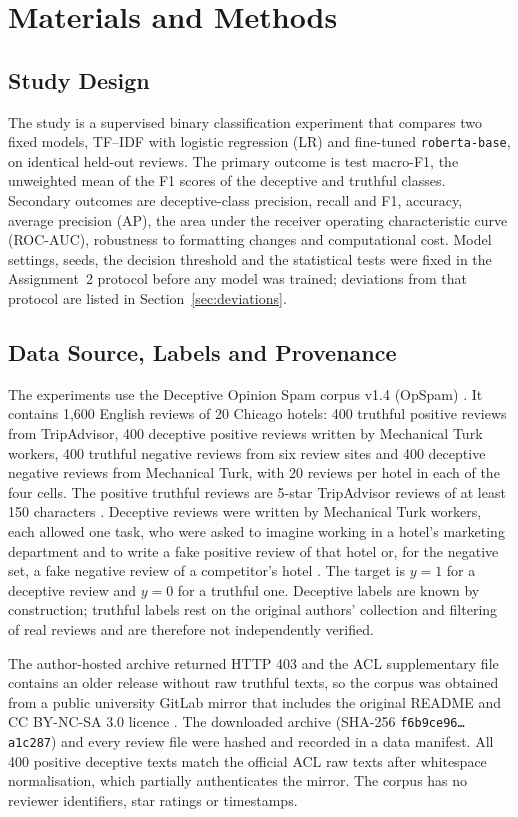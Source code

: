 \section{Materials and Methods}
\label{sec:methods}
\subsection{Study Design}
The study is a supervised binary classification experiment that compares two fixed models, TF--IDF with logistic regression (LR) and fine-tuned \texttt{roberta-base}, on identical held-out reviews. The primary outcome is test macro-F1, the unweighted mean of the F1 scores of the deceptive and truthful classes. Secondary outcomes are deceptive-class precision, recall and F1, accuracy, average precision (AP), the area under the receiver operating characteristic curve (ROC-AUC), robustness to formatting changes and computational cost. Model settings, seeds, the decision threshold and the statistical tests were fixed in the Assignment~2 protocol before any model was trained; deviations from that protocol are listed in Section~\ref{sec:deviations}.

\subsection{Data Source, Labels and Provenance}
The experiments use the Deceptive Opinion Spam corpus v1.4 (OpSpam) \cite{ref22,ott2013}. It contains 1,600 English reviews of 20 Chicago hotels: 400 truthful positive reviews from TripAdvisor, 400 deceptive positive reviews written by Mechanical Turk workers, 400 truthful negative reviews from six review sites and 400 deceptive negative reviews from Mechanical Turk, with 20 reviews per hotel in each of the four cells. The positive truthful reviews are 5-star TripAdvisor reviews of at least 150 characters \cite{ref22}. Deceptive reviews were written by Mechanical Turk workers, each allowed one task, who were asked to imagine working in a hotel's marketing department and to write a fake positive review of that hotel or, for the negative set, a fake negative review of a competitor's hotel \cite{ref22,ott2013}. The target is $y=1$ for a deceptive review and $y=0$ for a truthful one. Deceptive labels are known by construction; truthful labels rest on the original authors' collection and filtering of real reviews and are therefore not independently verified.

The author-hosted archive returned HTTP 403 and the ACL supplementary file contains an older release without raw truthful texts, so the corpus was obtained from a public university GitLab mirror that includes the original README and CC BY-NC-SA 3.0 licence \cite{opspam_mirror}. The downloaded archive (SHA-256 \texttt{f6b9ce96\ldots{}a1c287}) and every review file were hashed and recorded in a data manifest. All 400 positive deceptive texts match the official ACL raw texts after whitespace normalisation, which partially authenticates the mirror. The corpus has no reviewer identifiers, star ratings or timestamps.


